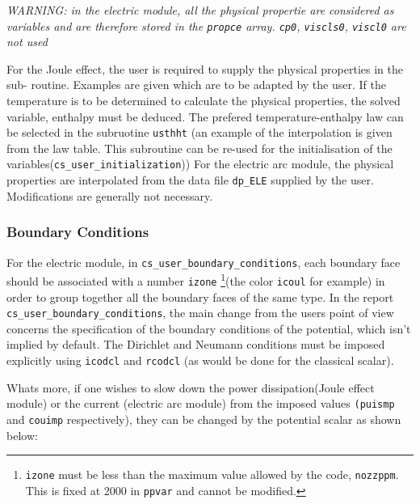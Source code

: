 {{{\em WARNING: in the electric module, all the physical propertie are considered as variables
 and are therefore stored in the \texttt{propce} array. \texttt{cp0}, \texttt{viscls0}, \texttt{viscl0}
 are not used}

For the Joule effect, the user is required to supply the physical properties in the sub-
routine. Examples are given which are to be adapted by the user. If the temperature is
to be determined to calculate the physical properties, the solved variable, enthalpy must
 be deduced. The prefered temperature-enthalpy law can be selected in the subruotine
 \texttt{usthht} (an example of the interpolation is given from the law table. This
subroutine can be re-used for the initialisation of the variables(\texttt{cs\_user\_initialization}))
 For the electric arc module, the physical properties are interpolated from the data file
 \texttt{dp\_ELE} supplied by the user. Modifications are generally not necessary.

\subsubsection{Boundary Conditions}

For the electric module, in \texttt{cs\_user\_boundary\_conditions}, each
boundary face should be associated with a number
 \texttt{izone} \footnote{\texttt{izone} must be less than the maximum
 value allowed by the code, \texttt{nozzppm}. This is fixed at 2000 in \texttt
{ppvar} and cannot be modified.}(the color \texttt{icoul} for example) in
 order to group together all the boundary faces of the same type. In the report
 \texttt{cs\_user\_boundary\_conditions}, the main change from the users point of view concerns the
 specification of the boundary conditions of the potential, which isn't
 implied by default. The Dirichlet and Neumann conditions must be imposed
 explicitly using \texttt{icodcl} and \texttt{rcodcl} (as would be done for
 the classical scalar).

Whats more, if one wishes to slow down the power dissipation(Joule
effect module) or the current (electric arc module) from the imposed values
\texttt{(puismp} and \texttt{couimp} respectively),
 they can be changed by the potential scalar as shown below:

}}
